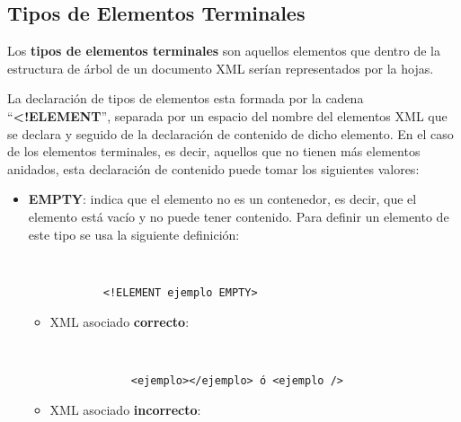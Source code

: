 \subsection{Tipos de Elementos Terminales}

Los \textbf{tipos de elementos terminales} son aquellos elementos que dentro de la estructura de árbol de un documento XML serían representados por la hojas.

La declaración de tipos de elementos esta formada por la cadena ``\textbf{<!ELEMENT}'', separada por un espacio del nombre del elementos XML que se declara y seguido de la declaración de contenido de dicho elemento. En el caso de los elementos terminales, es decir, aquellos que no tienen más elementos anidados, esta declaración de contenido puede tomar los siguientes valores:

\begin{itemize}
    \item \textbf{EMPTY}: indica que el elemento no es un contenedor, es decir, que el elemento está vacío y no puede tener contenido. Para definir un elemento de este tipo se usa la siguiente definición:

        \begin{figure}[h]
        \begin{tcolorbox}[sharp corners, colback=yellow!30, colframe=white!20]
            \scriptsize
            \begin{verbatim}


      <!ELEMENT ejemplo EMPTY>
            \end{verbatim}
        \end{tcolorbox}
    \end{figure}

    \begin{itemize}
        \item XML asociado \textbf{correcto}:

     \begin{figure}[h]
        \begin{tcolorbox}[sharp corners, colback=yellow!30, colframe=white!20]
           \scriptsize
           \begin{verbatim}


       <ejemplo></ejemplo> ó <ejemplo />
           \end{verbatim}
       \end{tcolorbox}
    \end{figure}

    \item XML asociado \textbf{incorrecto}:


\end{itemize}
\end{itemize}
